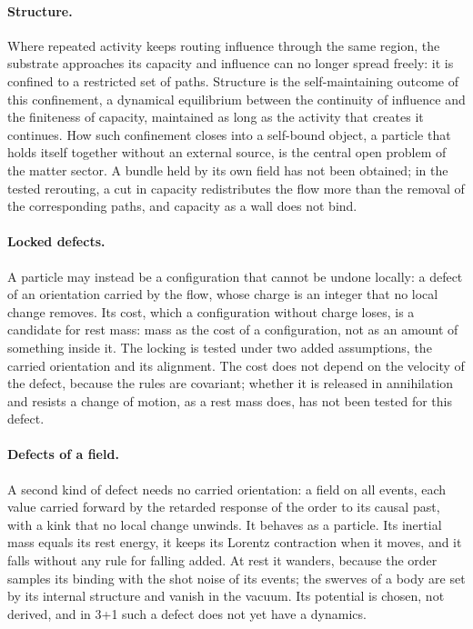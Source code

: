 \paragraph{Structure.} Where repeated activity keeps routing influence through the same region, the
substrate approaches its capacity and influence can no longer spread freely: it is confined to a
restricted set of paths. Structure is the self-maintaining outcome of this confinement, a dynamical
equilibrium between the continuity of influence and the finiteness of capacity, maintained as long as
the activity that creates it continues. \quad How such confinement closes into
a self-bound object, a particle that holds itself together without an external source, is the central
open problem of the matter sector. \quad A bundle held by its own field has not been obtained; in the
tested rerouting, a cut in capacity redistributes the flow more than the removal of the corresponding paths, and
capacity as a wall does not bind.

\paragraph{Locked defects.} A particle may instead be a configuration that cannot be undone locally: a defect
of an orientation carried by the flow, whose charge is an integer that no local change removes. Its cost,
which a configuration without charge loses, is a candidate for rest mass: mass as the cost of a
configuration, not as an amount of something inside it. The locking is tested under two added assumptions,
the carried orientation and its alignment. \quad The cost does not depend on the
velocity of the defect, because the rules are covariant; whether it is released in annihilation and resists a
change of motion, as a rest mass does, has not been tested for this defect. 

\paragraph{Defects of a field.} A second kind of defect needs no carried orientation: a field on all events, each
value carried forward by the retarded response of the order to its causal past, with a kink that no local change
unwinds. It behaves as a particle. Its inertial mass equals its rest energy, it keeps its Lorentz contraction when
it moves, and it falls without any rule for falling added.
\quad At rest it wanders, because the order
samples its binding with the shot noise of its events; the swerves of a body are set by its internal structure and
vanish in the vacuum. \quad Its potential is chosen, not derived, and in
3+1 such a defect does not yet have a dynamics. 

